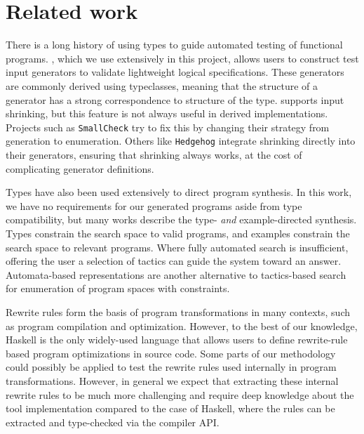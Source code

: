 \section{Related work}
\label{sec:related}

There is a long history of using types to guide automated testing of functional programs. \Quickcheck \cite{claessen2000quickcheck}, which we use extensively in this project, allows users to construct test input generators to validate lightweight logical specifications. These generators are commonly derived using typeclasses, meaning that the structure of a generator has a strong correspondence to structure of the type. \Quickcheck supports input shrinking, but this feature is not always useful in derived implementations. Projects such as \texttt{SmallCheck} \cite{runciman2008smallcheck} try to fix this by changing their strategy from generation to enumeration. Others like \texttt{Hedgehog} \cite{hedgehog} integrate shrinking directly into their generators, ensuring that shrinking always works, at the cost of complicating generator definitions.

Types have also been used extensively to direct program synthesis. In this work, we have no requirements for our generated programs aside from type compatibility, but many works describe the type- \textit{and} example-directed synthesis. \cite{osera2015type, feser2015synthesizing} Types constrain the search space to valid programs, and examples constrain the search space to relevant programs. Where fully automated search is insufficient, offering the user a selection of tactics can guide the system toward an answer. \cite{delahaye2000tactic} Automata-based representations \cite{koppel2022searching} are another alternative to tactics-based search for enumeration of program spaces with constraints.

Rewrite rules form the basis of program transformations in many contexts, such
as program compilation and optimization\cite{visser2005survey}. However, to the
best of our knowledge, Haskell is the only widely-used language that allows
users to define rewrite-rule based program optimizations in source code. Some
parts of our methodology could possibly be applied to test the rewrite rules
used internally in program transformations. However, in general we expect
that extracting these internal rewrite rules to be much more challenging and
require deep knowledge about the tool implementation compared to the case of
Haskell, where the rules can be extracted and type-checked via the compiler API.

